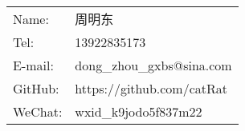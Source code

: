 \begin{tabular}{ll}
  Name: & 周明东 \\
  Tel: & 13922835173 \\
  E-mail: & dong\_zhou\_gxbs@sina.com \\
  GitHub: & https://github.com/catRat \\
  WeChat: & wxid\_k9jodo5f837m22
\end{tabular}

